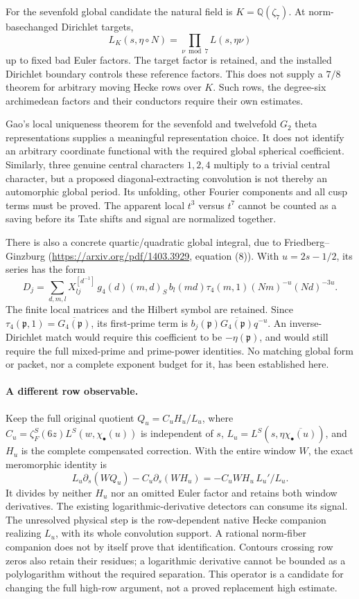 \documentclass[11pt]{article}
\begin{document}
For the sevenfold global candidate the natural field is
\(K=\mathbb Q(\zeta_7)\). At norm-basechanged Dirichlet targets,
\[
 L_K(s,\eta\circ N)=\prod_{\nu\bmod7}L(s,\eta\nu)
\]
up to fixed bad Euler factors. The target factor is retained, and the
installed Dirichlet boundary controls these reference factors.
This does not supply a \(7/8\) theorem for arbitrary moving Hecke rows
over \(K\). Such rows, the degree-six archimedean factors and their
conductors require their own estimates.

Gao's local uniqueness theorem for the sevenfold and twelvefold
\(G_2\) theta representations supplies a meaningful representation
choice. It does not identify an arbitrary coordinate functional with
the required global spherical coefficient. Similarly, three genuine
central characters \(1,2,4\) multiply to a trivial central character,
but a proposed diagonal-extracting convolution is not thereby an
automorphic global period. Its unfolding, other Fourier components
and all cusp terms must be proved. The apparent local \(t^3\) versus
\(t^7\) cannot be counted as a saving before its Tate shifts and signal
are normalized together.

There is also a concrete quartic/quadratic global integral, due to
Friedberg--Ginzburg
(\url{https://arxiv.org/pdf/1403.3929}, equation (8)).
With \(u=2s-1/2\), its series has the form
\[
 D_j=\sum_{d,m,l}X^{[d^{-1}]}_{lj}\,
       g_4(d)(m,d)_S\,b_l(md)\tau_4(m,1)
       (Nm)^{-u}(Nd)^{-3u}.
\]
The finite local matrices and the Hilbert symbol are retained.
Since \(\tau_4(\mathfrak p,1)=\overline{G_4(\mathfrak p)}\),
its first-prime term is
\(b_j(\mathfrak p)\overline{G_4(\mathfrak p)}q^{-u}\).
An inverse-Dirichlet match would require this coefficient to be
\(-\eta(\mathfrak p)\), and would still require the full mixed-prime
and prime-power identities. No matching global form or packet, nor
a complete exponent budget for it, has been established here.

\paragraph{A different row observable.}
Keep the full original quotient
\(Q_u=C_uH_u/L_u\), where
\(C_u=\zeta_F^S(6z)L^S(w,\chi_\bullet(u))\) is independent of \(s\),
\(L_u=L^S(s,\eta\overline{\chi_\bullet(u)})\), and \(H_u\) is the
complete compensated correction. With the entire window \(W\), the
exact meromorphic identity is
\[
 L_u\partial_s(WQ_u)-C_u\partial_s(WH_u)
       =-C_uWH_u\,L_u'/L_u .
\]
It divides by neither \(H_u\) nor an omitted Euler factor and retains
both window derivatives. The existing logarithmic-derivative
detectors can consume its signal. The unresolved physical step is the
row-dependent native Hecke companion realizing \(L_u\), with its
whole convolution support. A rational norm-fiber companion does not
by itself prove that identification. Contours crossing row zeros
also retain their residues; a logarithmic derivative cannot be
bounded as a polylogarithm without the required separation.
This operator is a candidate for changing the full high-row argument,
not a proved replacement high estimate.
\end{document}
